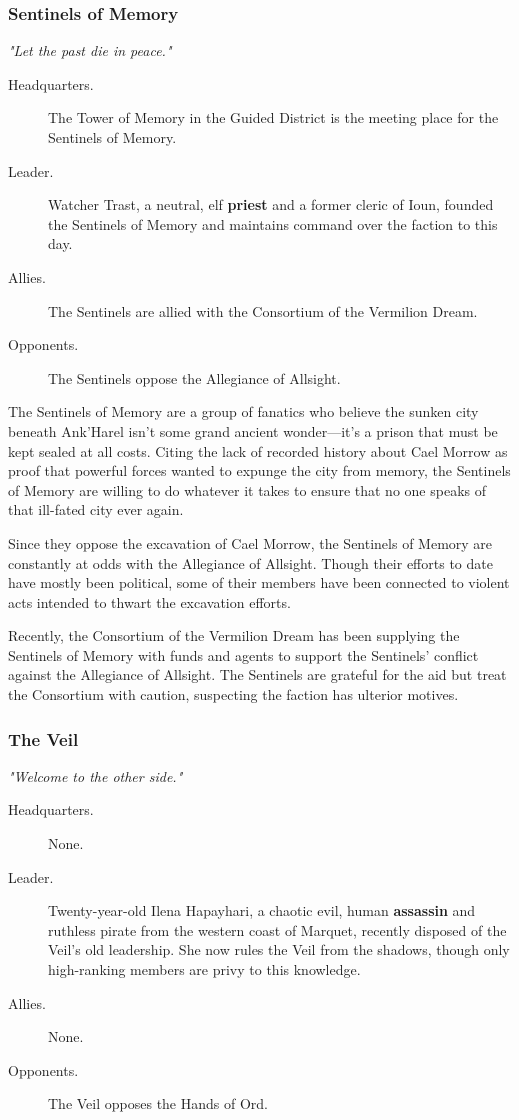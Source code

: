 \documentclass[letterpaper, 11pt, bg=full, twocolumn]{dndbook}
\begin{document}
\subsubsection{Sentinels of Memory}

\textit{"Let the past die in peace."}

\begin{description}
\item[Headquarters.] The Tower of Memory in the Guided District is the meeting place for the Sentinels of Memory.
\item[Leader.] Watcher Trast, a neutral, elf \textbf{priest} and a former cleric of Ioun, founded the Sentinels of Memory and maintains command over the faction to this day.
\item[Allies.] The Sentinels are allied with the Consortium of the Vermilion Dream.
\item[Opponents.] The Sentinels oppose the Allegiance of Allsight.
\end{description}

The Sentinels of Memory are a group of fanatics who believe the sunken city beneath Ank'Harel isn't some grand ancient wonder---it's a prison that must be kept sealed at all costs. Citing the lack of recorded history about Cael Morrow as proof that powerful forces wanted to expunge the city from memory, the Sentinels of Memory are willing to do whatever it takes to ensure that no one speaks of that ill-fated city ever again.

Since they oppose the excavation of Cael Morrow, the Sentinels of Memory are constantly at odds with the Allegiance of Allsight. Though their efforts to date have mostly been political, some of their members have been connected to violent acts intended to thwart the excavation efforts.

Recently, the Consortium of the Vermilion Dream has been supplying the Sentinels of Memory with funds and agents to support the Sentinels' conflict against the Allegiance of Allsight. The Sentinels are grateful for the aid but treat the Consortium with caution, suspecting the faction has ulterior motives.

\subsubsection{The Veil}

\textit{"Welcome to the other side."}

\begin{description}
\item[Headquarters.] None.
\item[Leader.] Twenty-year-old Ilena Hapayhari, a chaotic evil, human \textbf{assassin} and ruthless pirate from the western coast of Marquet, recently disposed of the Veil's old leadership. She now rules the Veil from the shadows, though only high-ranking members are privy to this knowledge.
\item[Allies.] None.
\item[Opponents.] The Veil opposes the Hands of Ord.
\end{description}
\end{document}
